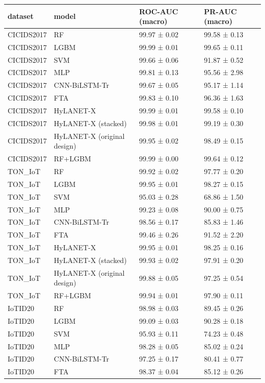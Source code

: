 \begin{tabular}{llll}
\toprule
dataset & model & ROC-AUC (macro) & PR-AUC (macro) \\
\midrule
CICIDS2017 & RF & 99.97 ± 0.02 & 99.58 ± 0.13 \\
CICIDS2017 & LGBM & 99.99 ± 0.01 & 99.65 ± 0.11 \\
CICIDS2017 & SVM & 99.66 ± 0.06 & 91.87 ± 0.52 \\
CICIDS2017 & MLP & 99.81 ± 0.13 & 95.56 ± 2.98 \\
CICIDS2017 & CNN-BiLSTM-Tr & 99.67 ± 0.05 & 95.17 ± 1.14 \\
CICIDS2017 & FTA & 99.83 ± 0.10 & 96.36 ± 1.63 \\
CICIDS2017 & HyLANET-X & 99.99 ± 0.01 & 99.58 ± 0.10 \\
CICIDS2017 & HyLANET-X (stacked) & 99.98 ± 0.01 & 99.19 ± 0.30 \\
CICIDS2017 & HyLANET-X (original design) & 99.95 ± 0.02 & 98.49 ± 0.15 \\
CICIDS2017 & RF+LGBM & 99.99 ± 0.00 & 99.64 ± 0.12 \\
TON\_IoT & RF & 99.92 ± 0.02 & 97.77 ± 0.20 \\
TON\_IoT & LGBM & 99.95 ± 0.01 & 98.27 ± 0.15 \\
TON\_IoT & SVM & 95.03 ± 0.28 & 68.86 ± 1.50 \\
TON\_IoT & MLP & 99.23 ± 0.08 & 90.00 ± 0.75 \\
TON\_IoT & CNN-BiLSTM-Tr & 98.56 ± 0.17 & 85.83 ± 1.46 \\
TON\_IoT & FTA & 99.46 ± 0.26 & 91.52 ± 2.20 \\
TON\_IoT & HyLANET-X & 99.95 ± 0.01 & 98.25 ± 0.16 \\
TON\_IoT & HyLANET-X (stacked) & 99.93 ± 0.02 & 97.91 ± 0.20 \\
TON\_IoT & HyLANET-X (original design) & 99.88 ± 0.05 & 97.25 ± 0.54 \\
TON\_IoT & RF+LGBM & 99.94 ± 0.01 & 97.90 ± 0.11 \\
IoTID20 & RF & 98.98 ± 0.03 & 89.45 ± 0.26 \\
IoTID20 & LGBM & 99.09 ± 0.03 & 90.28 ± 0.18 \\
IoTID20 & SVM & 95.93 ± 0.11 & 74.23 ± 0.48 \\
IoTID20 & MLP & 98.28 ± 0.05 & 85.02 ± 0.24 \\
IoTID20 & CNN-BiLSTM-Tr & 97.25 ± 0.17 & 80.41 ± 0.77 \\
IoTID20 & FTA & 98.37 ± 0.04 & 85.12 ± 0.26 \\

\end{tabular}
